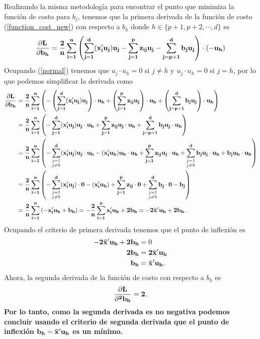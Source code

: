 \documentclass[paper=letter, fontsize=11pt]{scrartcl}
\numberwithin{equation}{section} %
\numberwithin{figure}{section} %
\numberwithin{table}{section} %
\begin{document}
Realizando la misma metodología para encontrar el punto que minimiza la función de costo para $b_j$, tenemos que la primera derivada de la función de costo (\ref{function_cost_new}) con respecto a $b_h$ donde $h\in \{p+1,p+2, \cdots, d\}$ es  
\begin{align*}
    \bf \frac{\partial L}{\partial b_{h}} = \frac{2}{n}\sum_{i=1}^n \left( \sum_{j=1}^d (x_i'u_j)u_j-\sum_{j=1}^p z_{ij}u_j-\sum_{j=p+1}^d b_j u_j \right) \cdot \left(-u_h\right) 
\end{align*}
Ocupando (\ref{normal}) tenemos que $u_j \cdot u_h=0$ si $j\neq h$ y $u_j \cdot u_h=0$ si $j=h$, por lo que podemos simplificar la derivada como
\begin{align*}
    \bf \frac{\partial L}{\partial b_{h}} &= \bf  \frac{2}{n}\sum_{i=1}^n\left( -\left(\sum_{j=1}^d (x_i'u_j)u_j\right)\cdot u_h+\left(\sum_{j=1}^p z_{ij}u_j\right)\cdot u_h+\left(\sum_{j=p+1}^d b_j u_j\right)\cdot u_h \right)\\
    &\bf = \frac{2}{n}\sum_{i=1}^n\left( -\sum_{j=1}^d (x_i'u_j)u_j\cdot u_h+\sum_{j=1}^p z_{ij}u_j\cdot u_h+\sum_{j=p+1}^d b_j u_j\cdot u_h\right) \\
    &\bf = \frac{2}{n}\sum_{i=1}^n\left( -\sum_{\substack{j=1 \\ j\neq h }}^d (x_i'u_j)u_j\cdot u_h-(x_i'u_h)u_h\cdot u_h+\sum_{j=1}^p z_{ij}u_j\cdot u_h+\sum_{\substack{j=1 \\ j\neq h }}^d b_j u_j\cdot u_h+b_j u_h\cdot u_h\right) \\
    &\bf = \frac{2}{n}\sum_{i=1}^n\left(-\sum_{\substack{j=1 \\ j\neq h }}^d (x_i'u_j)\cdot 0-(x_i'u_h)+\sum_{j=1}^p z_{ij}\cdot 0+\sum_{\substack{j=1 \\ j\neq h }}^d b_j \cdot 0-b_j\right) \\
    &\bf =  \frac{2}{n}\sum_{i=1}^n\left(-x_i'u_h+b_{h}\right) =-\frac{2}{n}\sum_{i=1}^n x_i'u_h+2b_h=-2\bar{x}'u_h+2b_h.
\end{align*}
Ocupando el criterio de primera derivada tenemos que el punto de inflexión es 
\begin{align*}
     \bf -2\bar{x}'u_h+2b_h&=0\\
     \bf 2b_h&=\bf 2\bar{x}'u_h\\
     \bf b_h&=\bf \bar{x}'u_h.
\end{align*}
Ahora, la segunda derivada de la función de costo con respecto a $b_{h}$ es 
\begin{align*}
    \bf \frac{\partial L}{\partial^2 b_{h}} = 2.
\end{align*}
\textbf{Por lo tanto, como la segunda derivada es no negativa podemos concluir usando el criterio de segunda derivada que el punto  de inflexión $\bf b_{h}=\bar{x}'u_h$ es un mínimo.}\\
\end{document}
